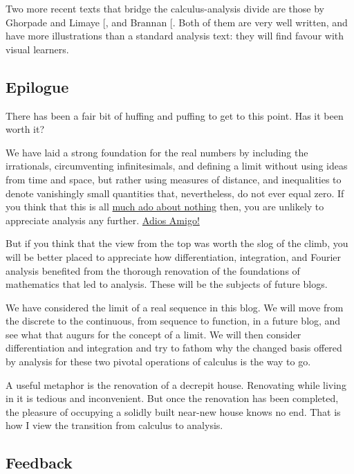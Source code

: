 \documentclass[
  a4paper,
]{article}
\begin{document}
Two more recent texts that bridge the calculus-analysis divide are those
by Ghorpade and Limaye {[}\citeproc{ref-ghorpadelimaye2006}{15}{]}, and
Brannan {[}\citeproc{ref-brannan2006}{16}{]}. Both of them are very well
written, and have more illustrations than a standard analysis text: they
will find favour with visual learners.

\subsection{Epilogue}\label{epilogue}

There has been a fair bit of huffing and puffing to get to this point.
Has it been worth it?

We have laid a strong foundation for the real numbers by including the
irrationals, circumventing infinitesimals, and defining a limit without
using ideas from time and space, but rather using measures of distance,
and inequalities to denote vanishingly small quantities that,
nevertheless, do not ever equal zero. If you think that this is all
\href{https://www.powerthesaurus.org/much_ado_about_nothing/synonyms}{much
ado about nothing} then, you are unlikely to appreciate analysis any
further.
\href{https://www.spanishdict.com/translate/adios\%20amigo}{Adios
Amigo!}

But if you think that the view from the top was worth the slog of the
climb, you will be better placed to appreciate how differentiation,
integration, and Fourier analysis benefited from the thorough renovation
of the foundations of mathematics that led to analysis. These will be
the subjects of future blogs.

We have considered the limit of a real sequence in this blog. We will
move from the discrete to the continuous, from sequence to function, in
a future blog, and see what that augurs for the concept of a limit. We
will then consider differentiation and integration and try to fathom why
the changed basis offered by analysis for these two pivotal operations
of calculus is the way to go.

A useful metaphor is the renovation of a decrepit house. Renovating
while living in it is tedious and inconvenient. But once the renovation
has been completed, the pleasure of occupying a solidly built near-new
house knows no end. That is how I view the transition from calculus to
analysis.

\subsection{Feedback}\label{feedback}
\end{document}
